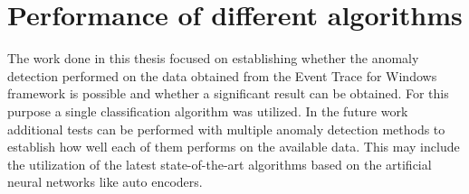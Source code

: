 \documentclass[a4paper,twoside,12pt]{book}
\newcounter{PagesWithoutNumbers}
\begin{document}
\section{Performance of different algorithms}

The work done in this thesis focused on establishing whether the anomaly detection performed on the
data obtained from the Event Trace for Windows framework is possible and whether a significant result
can be obtained. For this purpose a single classification algorithm was utilized. In the future work 
additional tests can be performed with multiple anomaly detection methods to establish how well each 
of them performs on the available data. This may include the utilization of the latest state-of-the-art 
algorithms based on the artificial neural networks like auto encoders.






\backmatter
{}
\setcounter{page}{\value{PagesWithoutNumbers}}

\pagestyle{onlyPageNumbers}




\end{document}
